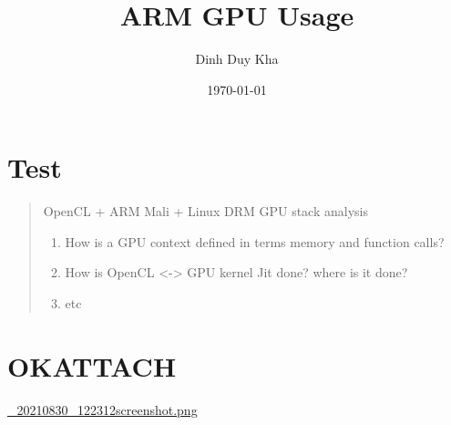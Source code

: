\documentclass[11pt]{article}
\author{Dinh Duy Kha}
\date{\today}
\title{ARM GPU Usage}
\begin{document}
\maketitle
\tableofcontents

\begin{latex}

\end{latex}



\section{Test}
\label{sec:org89845b3}
\begin{quote}


OpenCL + ARM Mali + Linux DRM  GPU stack analysis

\begin{enumerate}
\item How is a GPU context defined in terms memory and function calls?
\item How is OpenCL <-> GPU kernel Jit done? where is it done?
\item etc
\end{enumerate}
\end{quote}





\section{OK\hfill{}\textsc{ATTACH}}
\label{sec:org6aa4260}
\url{\_20210830\_122312screenshot.png}
\end{document}
